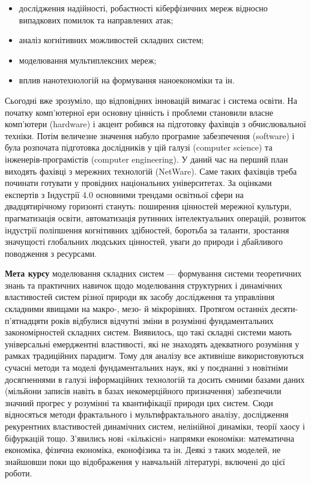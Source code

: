 \documentclass[
  letterpaper,
]{report}
\providecommand{\tightlist}{%
  \setlength{\itemsep}{0pt}\setlength{\parskip}{0pt}}\usepackage{longtable,booktabs,array}
\begin{document}
\begin{itemize}
\tightlist
\item
  дослідження надійності, робастності кіберфізичних мереж відносно
  випадкових помилок та направлених атак;
\item
  аналіз когнітивних можливостей складних систем;
\item
  моделювання мультиплексних мереж;
\item
  вплив нанотехнологій на формування наноекономіки та ін.
\end{itemize}

Сьогодні вже зрозуміло, що відповідних інновацій вимагає і система
освіти. На початку комп'ютерної ери основну цінність і проблеми
становили власне комп'ютери (hardware) і акцент робився на підготовку
фахівців з обчислювальної техніки. Потім величезне значення набуло
програмне забезпечення (software) і була розпочата підготовка
дослідників у цій галузі (computer science) та інженерів-програмістів
(computer engineering). У даний час на перший план виходять фахівці з
мережних технологій (NetWare). Саме таких фахівців треба починати
готувати у провідних національних університетах. За оцінками експертів з
Індустрії 4.0 основними трендами освітньої сфери на двадцятирічному
горизонті стануть: поширення цінностей мережної культури, прагматизація
освіти, автоматизація рутинних інтелектуальних операцій, розвиток
індустрії поліпшення когнітивних здібностей, боротьба за таланти,
зростання значущості глобальних людських цінностей, уваги до природи і
дбайливого поводження з ресурсами.

\textbf{Мета курсу} моделювання складних систем --- формування системи
теоретичних знань та практичних навичок щодо моделювання структурних і
динамічних властивостей систем різної природи як засобу дослідження та
управління складними явищами на макро-, мезо- й мікрорівнях. Протягом
останніх десяти-п'ятнадцяти років відбулися відчутні зміни в розумінні
фундаментальних закономірностей складних систем. Виявилось, що такі
складні системи мають універсальні емерджентні властивості, які не
знаходять адекватного розуміння у рамках традиційних парадигм. Тому для
аналізу все активніше використовуються сучасні методи та моделі
фундаментальних наук, які у поєднанні з новітніми досягненнями в галузі
інформаційних технологій та досить ємними базами даних (мільйони записів
навіть в базах некомерційного призначення) забезпечили значний прогрес у
розумінні та квантифікації природи цих систем. Сюди відносяться методи
фрактального і мультифрактального аналізу, дослідження рекурентних
властивостей динамічних систем, нелінійної динаміки, теорії хаосу і
біфуркацій тощо. З'явились нові «кількісні» напрямки економіки:
математична економіка, фізична економіка, еконофізика та ін. Деякі з
таких моделей, не знайшовши поки що відображення у навчальній
літературі, включені до цієї роботи.
\end{document}
